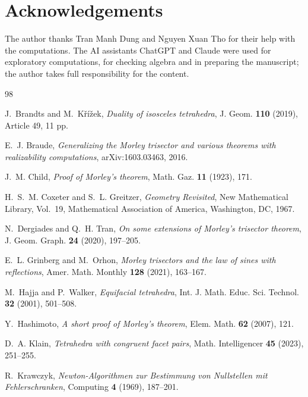 \documentclass[11pt]{article}
\theoremstyle{definition}
\theoremstyle{remark}
\begin{document}
\section*{Acknowledgements}
{}

The author thanks Tran Manh Dung and Nguyen Xuan Tho for their help with the computations. The AI assistants ChatGPT and Claude were used for exploratory computations, for checking algebra and in preparing the manuscript; the author takes full responsibility for the content.

{}
\begin{thebibliography}{98}

J.~Brandts and M.~K\v{r}\'i\v{z}ek, \emph{Duality of isosceles tetrahedra}, J. Geom. \textbf{110} (2019), Article 49, 11 pp.

E.~J. Braude, \emph{Generalizing the Morley trisector and various theorems with realizability computations}, arXiv:1603.03463, 2016.

J.~M. Child, \emph{Proof of Morley's theorem}, Math. Gaz. \textbf{11} (1923), 171.

H.~S.~M. Coxeter and S.~L. Greitzer, \emph{Geometry Revisited}, New Mathematical Library, Vol.~19, Mathematical Association of America, Washington, DC, 1967.

N.~Dergiades and Q.~H. Tran, \emph{On some extensions of Morley's trisector theorem}, J. Geom. Graph. \textbf{24} (2020), 197--205.

E.~L. Grinberg and M.~Orhon, \emph{Morley trisectors and the law of sines with reflections}, Amer. Math. Monthly \textbf{128} (2021), 163--167.

M.~Hajja and P.~Walker, \emph{Equifacial tetrahedra}, Int. J. Math. Educ. Sci. Technol. \textbf{32} (2001), 501--508.

Y.~Hashimoto, \emph{A short proof of Morley's theorem}, Elem. Math. \textbf{62} (2007), 121.

D.~A. Klain, \emph{Tetrahedra with congruent facet pairs}, Math. Intelligencer \textbf{45} (2023), 251--255.

R.~Krawczyk, \emph{Newton-Algorithmen zur Bestimmung von Nullstellen mit Fehlerschranken}, Computing \textbf{4} (1969), 187--201.


\end{thebibliography}
\end{document}
